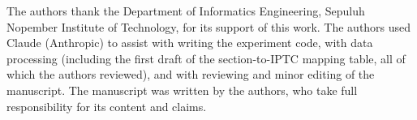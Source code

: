 The authors thank the Department of Informatics Engineering, Sepuluh Nopember Institute of Technology, for its support of this work. The authors used Claude (Anthropic) to assist with writing the experiment code, with data processing (including the first draft of the section-to-IPTC mapping table, all of which the authors reviewed), and with reviewing and minor editing of the manuscript. The manuscript was written by the authors, who take full responsibility for its content and claims.
